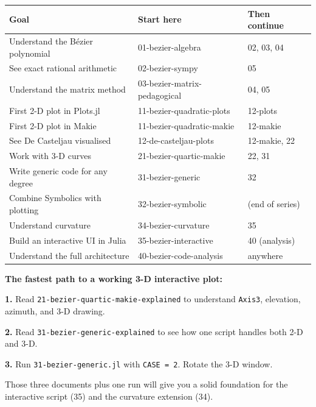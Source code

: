 \documentclass[12pt, a4paper]{article}
\newcommand{\cd}[1]{\texttt{#1}}
\begin{document}
\begin{center}
\renewcommand{\arraystretch}{1.4}
\begin{tabular}{p{6cm}p{4cm}p{3.5cm}}
\toprule
Goal & Start here & Then continue \\
\midrule
Understand the B\'ezier polynomial &
  01-bezier-algebra & 02, 03, 04 \\[4pt]
See exact rational arithmetic &
  02-bezier-sympy & 05 \\[4pt]
Understand the matrix method &
  03-bezier-matrix-pedagogical & 04, 05 \\[4pt]
First 2-D plot in Plots.jl &
  11-bezier-quadratic-plots & 12-plots \\[4pt]
First 2-D plot in Makie &
  11-bezier-quadratic-makie & 12-makie \\[4pt]
See De Casteljau visualised &
  12-de-casteljau-plots & 12-makie, 22 \\[4pt]
Work with 3-D curves &
  21-bezier-quartic-makie & 22, 31 \\[4pt]
Write generic code for any degree &
  31-bezier-generic & 32 \\[4pt]
Combine Symbolics with plotting &
  32-bezier-symbolic & (end of series) \\[4pt]
Understand curvature &
  34-bezier-curvature & 35 \\[4pt]
Build an interactive UI in Julia &
  35-bezier-interactive & 40 (analysis) \\[4pt]
Understand the full architecture &
  40-bezier-code-analysis & anywhere \\
\bottomrule
\end{tabular}
\end{center}

\begin{insightbox}
\textbf{The fastest path to a working 3-D interactive plot:}

\textbf{1.} Read \cd{21-bezier-quartic-makie-explained}
to understand \cd{Axis3}, elevation, azimuth, and 3-D drawing.

\textbf{2.} Read \cd{31-bezier-generic-explained} to see
how one script handles both 2-D and 3-D.

\textbf{3.} Run \cd{31-bezier-generic.jl} with \cd{CASE = 2}.
Rotate the 3-D window.

Those three documents plus one run will give you a
solid foundation for the interactive script (35) and the
curvature extension (34).
\end{insightbox}


\end{document}
